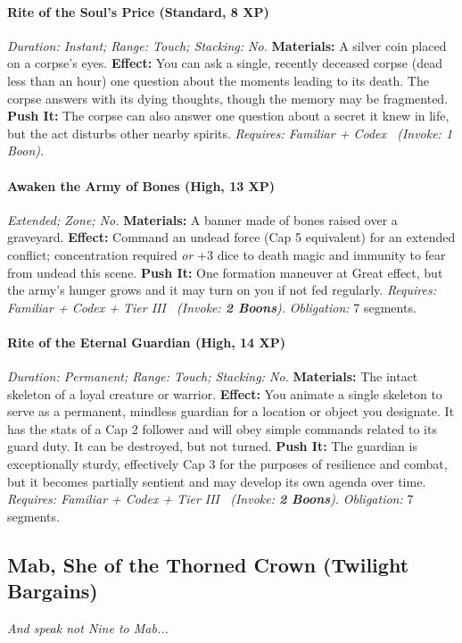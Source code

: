 \documentclass[12pt,twoside]{book}
\begin{document}
\paragraph{Rite of the Soul's Price (Standard, 8 XP)} \emph{Duration: Instant; Range: Touch; Stacking: No.}
\textbf{Materials:} A silver coin placed on a corpse's eyes.
\textbf{Effect:} You can ask a single, recently deceased corpse (dead less than an hour) one question about the moments leading to its death. The corpse answers with its dying thoughts, though the memory may be fragmented.
\textbf{Push It:} The corpse can also answer one question about a secret it knew in life, but the act disturbs other nearby spirits.
\emph{Requires: Familiar + Codex \ (\textit{Invoke:} 1 Boon).}
\paragraph{Awaken the Army of Bones (High, 13 XP)} \emph{Extended; Zone; No.}
\textbf{Materials:} A banner made of bones raised over a graveyard.
\textbf{Effect:} Command an undead force (Cap 5 equivalent) for an extended conflict; concentration required \emph{or} +3 dice to death magic and immunity to fear from undead this scene.
\textbf{Push It:} One formation maneuver at Great effect, but the army's hunger grows and it may turn on you if not fed regularly.
\emph{Requires: Familiar + Codex + Tier III \ (\textit{Invoke:} \textbf{2 Boons}).}
\emph{Obligation:} 7 segments.

\paragraph{Rite of the Eternal Guardian (High, 14 XP)} \emph{Duration: Permanent; Range: Touch; Stacking: No.}
\textbf{Materials:} The intact skeleton of a loyal creature or warrior.
\textbf{Effect:} You animate a single skeleton to serve as a permanent, mindless guardian for a location or object you designate. It has the stats of a Cap 2 follower and will obey simple commands related to its guard duty. It can be destroyed, but not turned.
\textbf{Push It:} The guardian is exceptionally sturdy, effectively Cap 3 for the purposes of resilience and combat, but it becomes partially sentient and may develop its own agenda over time.
\emph{Requires: Familiar + Codex + Tier III \ (\textit{Invoke:} \textbf{2 Boons}).}
\emph{Obligation:} 7 segments.

\subsection{Mab, She of the Thorned Crown (Twilight Bargains)}
\textit{And speak not Nine to Mab...}
\end{document}
